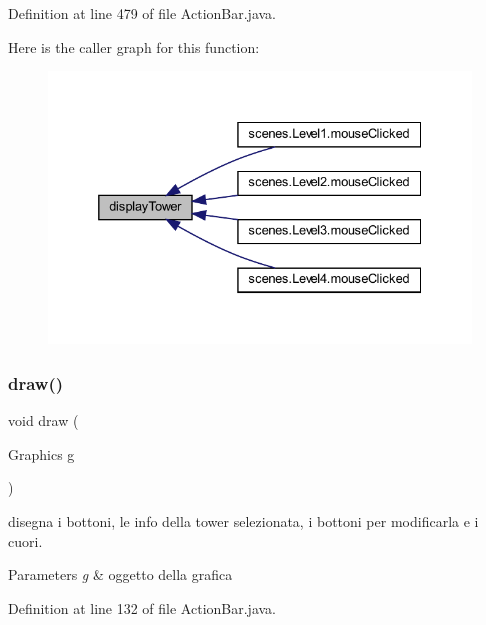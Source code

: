Definition at line 479 of file Action\+Bar.\+java.

Here is the caller graph for this function\+:\nopagebreak
\begin{figure}[H]
\begin{center}
\leavevmode
\includegraphics[width=332pt]{classui_1_1_action_bar_aacab7287bc123d863feb4551df131934_icgraph}
\end{center}
\end{figure}
\mbox{\label{classui_1_1_action_bar_a72fe1ffca978e99fd16994a10e7f8051}} 
\subsubsection{\texorpdfstring{draw()}{draw()}}
{\footnotesize\ttfamily void draw (\begin{DoxyParamCaption}\item[{Graphics}]{g }\end{DoxyParamCaption})}



disegna i bottoni, le info della tower selezionata, i bottoni per modificarla e i cuori. 


\begin{DoxyParams}{Parameters}
{\em g} & oggetto della grafica \\
\hline
\end{DoxyParams}


Definition at line 132 of file Action\+Bar.\+java.

